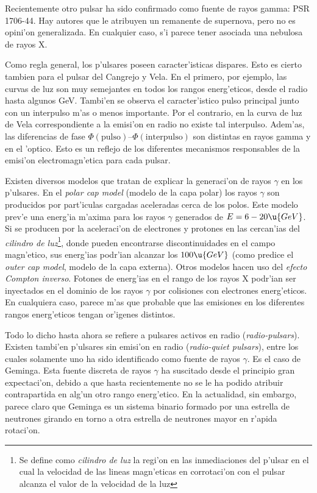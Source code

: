 Recientemente otro pulsar ha sido confirmado como fuente de rayos
gamma: PSR\,1706-44. Hay autores que le atribuyen un remanente de
supernova, pero no es opini'on generalizada. En cualquier caso, s'i
parece tener asociada una nebulosa de rayos X.

Como regla general, los p'ulsares poseen caracter'isticas
dispares. Esto es cierto tambien para el pulsar del Cangrejo y
Vela. En el primero, por ejemplo, las curvas de luz son muy semejantes
en todos los rangos energ'eticos, desde el radio hasta algunos
GeV. Tambi'en se observa el caracter'istico pulso principal junto con
un interpulso m'as o menos importante. Por el contrario, en la curva
de luz de Vela correspondiente a la emisi'on en radio no existe tal
interpulso. Adem'as, las diferencias de fase
$\Phi(\mathrm{pulso})$--$\Phi(\mathrm{interpulso})$ son distintas en
rayos gamma y en el 'optico. Esto es un reflejo de los diferentes
mecanismos responsables de la emisi'on electromagn'etica para cada
pulsar.

\pulsarschfig

Existen diversos modelos que tratan de explicar la generaci'on de
rayos $\gamma$ en los p'ulsares. En el \emph{polar cap model} (modelo
de la capa polar) los rayos $\gamma$ son producidos por part'iculas
cargadas aceleradas cerca de los polos. Este modelo prev'e una
energ'ia m'axima para los rayos $\gamma$ generados de
$E=6-20\u{GeV}$. Si se producen por la aceleraci'on de electrones y
protones en las cercan'ias del \emph{cilindro de luz}\footnote{Se
define como \emph{cilindro de luz} la regi'on en las inmediaciones del
p'ulsar en el cual la velocidad de las lineas magn'eticas en
corrotaci'on con el pulsar alcanza el valor de la velocidad de la
luz}, donde pueden encontrarse discontinuidades en el campo
magn'etico, sus energ'ias podr'ian alcanzar los $100\u{GeV}$ (como
predice el \emph{outer cap model}, modelo de la capa externa).  Otros
modelos hacen uso del \emph{efecto Compton inverso}.  Fotones de
energ'ias en el rango de los rayos X podr'ian ser inyectados en el
dominio de los rayos $\gamma$ por colisiones con electrones
energ'eticos. En cualquiera caso, parece m'as que probable que las
emisiones en los diferentes rangos energ'eticos tengan or'igenes
distintos.

Todo lo dicho hasta ahora se refiere a pulsares activos en radio
(\emph{radio-pulsars}). Existen tambi'en p'ulsares sin emisi'on en
radio (\emph{radio-quiet pulsars}), entre los cuales solamente uno ha
sido identificado como fuente de rayos $\gamma$. Es el caso de
Geminga. Esta fuente discreta de rayos $\gamma$ ha suscitado desde el
principio gran expectaci'on, debido a que hasta recientemente no se le
ha podido atribuir contrapartida en alg'un otro rango energ'etico. En
la actualidad, sin embargo, parece claro que Geminga es un sistema
binario formado por una estrella de neutrones girando en torno a otra
estrella de neutrones mayor en r'apida rotaci'on.

